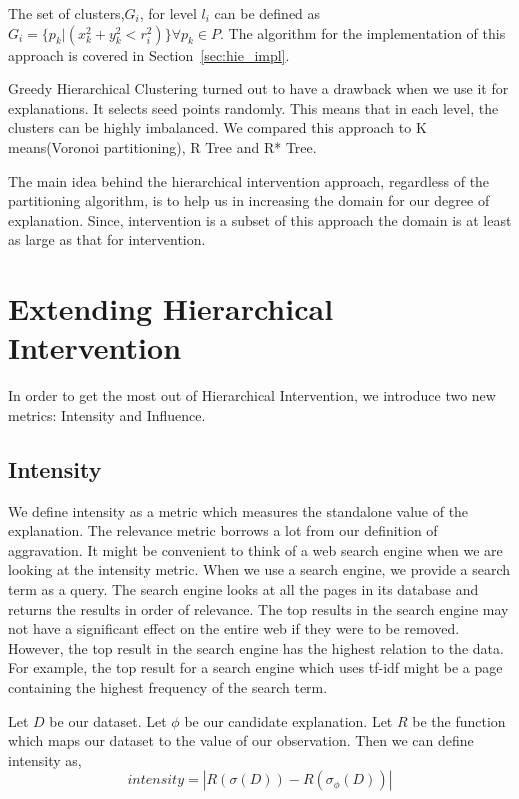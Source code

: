 The set of clusters,$G_i$, for level $l_i$ can be defined as $G_i=\{p_k|(x_k^2 + y_k^2 < r_i^2)\}\forall p_k \in P$. The algorithm for the implementation of this approach is covered in Section~\ref{sec:hie_impl}.

Greedy Hierarchical Clustering turned out to have a drawback when we use it for explanations. It selects seed points randomly. This means that in each level, the clusters can be highly imbalanced. We compared this approach to K means(Voronoi partitioning)\citep{hartigan1979algorithm,aurenhammer2000voronoi}, R Tree\citep{guttman1984r} and R* Tree\citep{beckmann1990r}.

The main idea behind the hierarchical intervention approach, regardless of the partitioning algorithm, is to help us in increasing the domain for our degree of explanation. Since, intervention is a subset of this approach the domain is at least as large as that for intervention.


\section{Extending Hierarchical Intervention}
\label{sec:extending_hi}

In order to get the most out of Hierarchical Intervention, we introduce two new metrics: Intensity and Influence.

\subsection{Intensity}
\label{sec:intensity}

We define intensity as a metric which measures the standalone value of the explanation. The relevance metric borrows a lot from our definition of aggravation. It might be convenient to think of a web search engine when we are looking at the intensity metric. When we use a search engine, we provide a search term as a query. The search engine looks at all the pages in its database and returns the results in order of relevance. The top results in the search engine may not have a significant effect on the entire web if they were to be removed. However, the top result in the search engine has the highest relation to the data. For example, the top result for a search engine which uses tf-idf might be a page containing the highest frequency of the search term\citep{robertson2004understanding}.

Let $D$ be our dataset. Let $\phi$ be our candidate explanation. Let $R$ be the function which maps our dataset to the value of our observation. Then we can define intensity as,
$$intensity = |R(\sigma (D)) - R(\sigma_\phi (D))|$$

